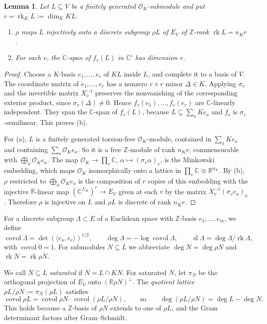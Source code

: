 \documentclass[10pt]{amsart}
\newtheorem{lemma}[theorem]{Lemma}
\theoremstyle{definition}
\theoremstyle{remark}
\newcommand{\C}{\mathbb C}
\newcommand{\R}{\mathbb R}
\newcommand{\Z}{\mathbb Z}
\begin{document}
\begin{lemma}\label{lem:realisation}
Let $L\subseteq V$ be a finitely generated $\mathcal O_K$-submodule and put $r=\operatorname{rk}_KL:=\dim_KKL$.
\begin{enumerate}
\item[(a)] $\rho$ maps $L$ injectively onto a discrete subgroup $\rho L$ of $E_V$ of $\Z$-rank $\operatorname{rk}L=n_Kr$.
\item[(b)] For each $v$, the $\C$-span of $f_v(L)$ in $\C^\iota$ has dimension $r$.
\end{enumerate}
\end{lemma}
\begin{proof}
Choose a $K$-basis $e_1,\dots,e_r$ of $KL$ inside $L$, and complete it to a basis of $V$. The coordinate matrix of $e_1,\dots,e_r$ has a nonzero $r\times r$ minor $\Delta\in K$. Applying $\sigma_v$ and the invertible matrix $X_v^{-1}$ preserves the nonvanishing of the corresponding exterior product, since $\sigma_v(\Delta)\neq0$. Hence $f_v(e_1),\dots,f_v(e_r)$ are $\C$-linearly independent. They span the $\C$-span of $f_v(L)$, because $L\subseteq\sum_aKe_a$ and $f_v$ is $\sigma_v$-semilinear. This proves (b).

For (a), $L$ is a finitely generated torsion-free $\mathcal O_K$-module, contained in $\sum_a K e_a$ and containing $\sum_a\mathcal O_Ke_a$. So it is a free $\Z$-module of rank $n_Kr$, commensurable with $\bigoplus_a\mathcal O_Ke_a$. The map $\mathcal O_K\to\prod_{v}\C$, $\alpha\mapsto(\sigma_v\alpha)_v$, is the Minkowski embedding, which maps $\mathcal O_K$ isomorphically onto a lattice in $\prod_v\C\cong\R^{n_K}$. By (b), $\rho$ restricted to $\bigoplus_a\mathcal O_Ke_a$ is the composition of $r$ copies of this embedding with the injective $\R$-linear map $(\C^{\Sigma_K})^r\to E_V$ given at each $v$ by the matrix $X_v^{-1}(\sigma_v e_a)_a$. Therefore $\rho$ is injective on $L$ and $\rho L$ is discrete of rank $n_Kr$.
\end{proof}

For a discrete subgroup $\Lambda\subset E$ of a Euclidean space with $\Z$-basis $e_1,\dots,e_m$, we define
\[
\operatorname{covol}\Lambda=\det(\langle e_a,e_c\rangle)^{1/2},\qquad \deg\Lambda=-\log\operatorname{covol}\Lambda,\qquad \operatorname{sl}\Lambda=\deg\Lambda/\operatorname{rk}\Lambda,
\]
with $\operatorname{covol}0=1$. For submodules $N\subseteq L$ we abbreviate $\deg N=\deg\rho N$ and $\operatorname{rk}N=\operatorname{rk}\rho N$.

We call $N\subseteq L$ \emph{saturated} if $N=L\cap KN$. For saturated $N$, let $\pi_N$ be the orthogonal projection of $E_V$ onto $(\R\rho N)^\perp$. The \emph{quotient lattice} $\rho L/\rho N:=\pi_N(\rho L)$ satisfies
\begin{equation}\label{eq:covol-mult}
\operatorname{covol}\rho L=\operatorname{covol}\rho N\cdot\operatorname{covol}(\rho L/\rho N),\qquad\text{so}\qquad \deg(\rho L/\rho N)=\deg L-\deg N .
\end{equation}
This holds because a $\Z$-basis of $\rho N$ extends to one of $\rho L$, and the Gram determinant factors after Gram--Schmidt.
\end{document}
